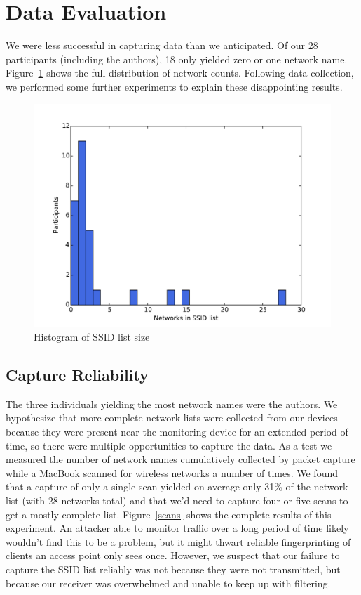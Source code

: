 \documentclass[letterpaper,twocolumn,10pt]{article}
\begin{document}
\section{Data Evaluation}
We were less successful in capturing data than we anticipated. Of our 28 participants (including the authors), 18 only yielded zero or one network name. Figure~\ref{histogram} shows the full distribution of network counts. Following data collection, we performed some further experiments to explain these disappointing results.

\begin{figure}
\includegraphics[width=\columnwidth]{hist.pdf}
\caption{Histogram of SSID list size}
\label{histogram}
\end{figure}

\FloatBarrier

\subsection{Capture Reliability}
The three individuals yielding the most network names were the authors. We hypothesize that more complete network lists were collected from our devices because they were present near the monitoring device for an extended period of time, so there were multiple opportunities to capture the data. As a test we measured the number of network names cumulatively collected by packet capture while a MacBook scanned for wireless networks a number of times. We found that a capture of only a single scan yielded on average only 31\% of the network list (with 28 networks total) and that we'd need to capture four or five scans to get a mostly-complete list. Figure~\ref{scans} shows the complete results of this experiment. An attacker able to monitor traffic over a long period of time likely wouldn't find this to be a problem, but it might thwart reliable fingerprinting of clients an access point only sees once. However, we suspect that our failure to capture the SSID list reliably was not because they were not transmitted, but because our receiver was overwhelmed and unable to keep up with filtering.
\end{document}
